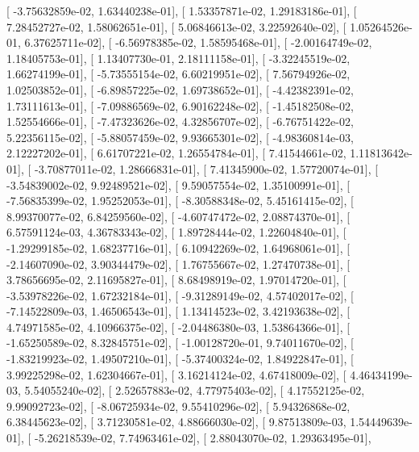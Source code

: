 \documentclass{article}
\begin{document}
       [ -3.75632859e-02,   1.63440238e-01],
       [  1.53357871e-02,   1.29183186e-01],
       [  7.28452727e-02,   1.58062651e-01],
       [  5.06846613e-02,   3.22592640e-02],
       [  1.05264526e-01,   6.37625711e-02],
       [ -6.56978385e-02,   1.58595468e-01],
       [ -2.00164749e-02,   1.18405753e-01],
       [  1.13407730e-01,   2.18111158e-01],
       [ -3.32245519e-02,   1.66274199e-01],
       [ -5.73555154e-02,   6.60219951e-02],
       [  7.56794926e-02,   1.02503852e-01],
       [ -6.89857225e-02,   1.69738652e-01],
       [ -4.42382391e-02,   1.73111613e-01],
       [ -7.09886569e-02,   6.90162248e-02],
       [ -1.45182508e-02,   1.52554666e-01],
       [ -7.47323626e-02,   4.32856707e-02],
       [ -6.76751422e-02,   5.22356115e-02],
       [ -5.88057459e-02,   9.93665301e-02],
       [ -4.98360814e-03,   2.12227202e-01],
       [  6.61707221e-02,   1.26554784e-01],
       [  7.41544661e-02,   1.11813642e-01],
       [ -3.70877011e-02,   1.28666831e-01],
       [  7.41345900e-02,   1.57720074e-01],
       [ -3.54839002e-02,   9.92489521e-02],
       [  9.59057554e-02,   1.35100991e-01],
       [ -7.56835399e-02,   1.95252053e-01],
       [ -8.30588348e-02,   5.45161415e-02],
       [  8.99370077e-02,   6.84259560e-02],
       [ -4.60747472e-02,   2.08874370e-01],
       [  6.57591124e-03,   4.36783343e-02],
       [  1.89728444e-02,   1.22604840e-01],
       [ -1.29299185e-02,   1.68237716e-01],
       [  6.10942269e-02,   1.64968061e-01],
       [ -2.14607090e-02,   3.90344479e-02],
       [  1.76755667e-02,   1.27470738e-01],
       [  3.78656695e-02,   2.11695827e-01],
       [  8.68498919e-02,   1.97014720e-01],
       [ -3.53978226e-02,   1.67232184e-01],
       [ -9.31289149e-02,   4.57402017e-02],
       [ -7.14522809e-03,   1.46506543e-01],
       [  1.13414523e-02,   3.42193638e-02],
       [  4.74971585e-02,   4.10966375e-02],
       [ -2.04486380e-03,   1.53864366e-01],
       [ -1.65250589e-02,   8.32845751e-02],
       [ -1.00128720e-01,   9.74011670e-02],
       [ -1.83219923e-02,   1.49507210e-01],
       [ -5.37400324e-02,   1.84922847e-01],
       [  3.99225298e-02,   1.62304667e-01],
       [  3.16214124e-02,   4.67418009e-02],
       [  4.46434199e-03,   5.54055240e-02],
       [  2.52657883e-02,   4.77975403e-02],
       [  4.17552125e-02,   9.99092723e-02],
       [ -8.06725934e-02,   9.55410296e-02],
       [  5.94326868e-02,   6.38445623e-02],
       [  3.71230581e-02,   4.88666030e-02],
       [  9.87513809e-03,   1.54449639e-01],
       [ -5.26218539e-02,   7.74963461e-02],
       [  2.88043070e-02,   1.29363495e-01],
\end{document}
